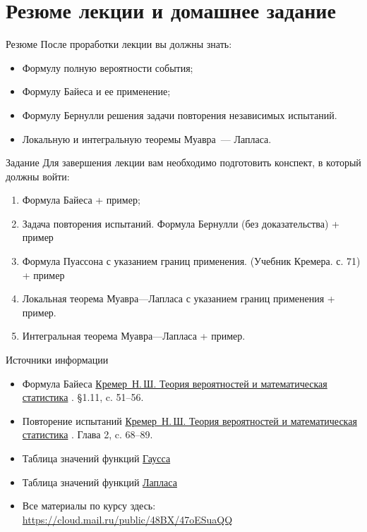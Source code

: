 \documentclass[unicode,11pt,notheorems,xcolor=table]{beamer}
\begin{document}
\section{Резюме лекции и домашнее задание}


\begin{frame}{Резюме}
	После проработки лекции вы должны знать:
	\begin{itemize}
	\item 
		Формулу полную вероятности события;
	\item 
		Формулу Байеса и ее применение;
	\item 
		Формулу Бернулли решения задачи повторения независимых испытаний.
    \item 
		Локальную и интегральную теоремы Муавра~--- Лапласа.
	\end{itemize}		
\end{frame}


\begin{frame}{Задание}
    Для завершения лекции вам необходимо подготовить конспект, в который должны войти:
	\begin{enumerate}
		\item 
            Формула Байеса + пример;
		\item 
            Задача повторения испытаний. Формула Бернулли (без доказательства) + пример
		\item 
            Формула Пуассона с указанием границ применения. (Учебник Кремера. с. 71) + пример 			
		\item 
            Локальная теорема Муавра\;---\;Лапласа с указанием границ применения + пример.
        \item 
            Интегральная теорема Муавра\;---\;Лапласа + пример.
	\end{enumerate}
\end{frame}
\begin{frame}{Источники информации}
\begin{itemize}
    \item 
    	Формула Байеса \href{https://cloud.mail.ru/public/2mU2/rFHg6QxdZ}{Кремер~Н.\,Ш. Теория вероятностей и математическая статистика} . \S 1.11, c. 51--56.
    \item 
        Повторение испытаний \href{https://cloud.mail.ru/public/jWCR/2BBwXTrkg}{Кремер~Н.\,Ш. Теория вероятностей и математическая статистика} . Глава 2, c. 68--89.    
    \item 
        Таблица значений  функций \href{https://cloud.mail.ru/public/5oAx/3MrM7rR4E}{Гаусса }
        \item 
        Таблица значений функций \href{https://cloud.mail.ru/public/3hfk/5Ey4LLdoi}{Лапласа}
	
    \item 
    	Все материалы по курсу здесь:
        \url{https://cloud.mail.ru/public/48BX/47oESuaQQ}
\end{itemize}
\end{frame}
\end{document}
